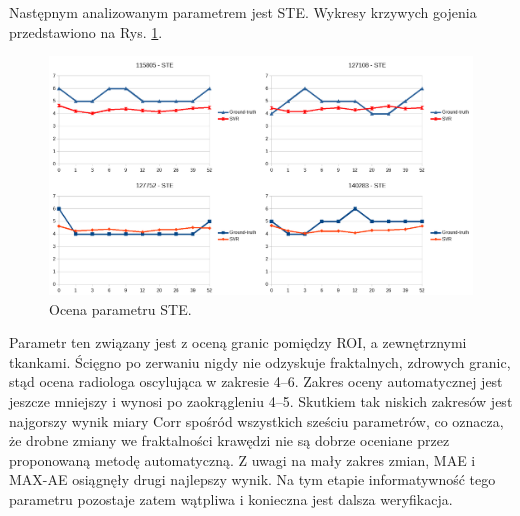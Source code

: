 Następnym analizowanym parametrem jest STE. Wykresy krzywych gojenia przedstawiono na Rys. \ref{fig:STE}.
\begin{figure}[h!]
	\centering
	\includegraphics[width=1\textwidth]{figures/STE.png}
	\caption{Ocena parametru STE.}\label{fig:STE}
\end{figure}
Parametr ten związany jest z oceną granic pomiędzy ROI, a zewnętrznymi tkankami. Ścięgno po zerwaniu nigdy nie odzyskuje fraktalnych, zdrowych granic, stąd ocena radiologa oscylująca w zakresie 4--6. Zakres oceny automatycznej jest jeszcze mniejszy i wynosi po zaokrągleniu 4--5. Skutkiem tak niskich zakresów jest najgorszy wynik miary Corr spośród wszystkich sześciu parametrów, co oznacza, że drobne zmiany we fraktalności krawędzi nie są dobrze oceniane przez proponowaną metodę automatyczną. Z uwagi na mały zakres zmian, MAE i MAX-AE osiągnęły drugi najlepszy wynik. Na tym etapie informatywność tego parametru pozostaje zatem wątpliwa i konieczna jest dalsza weryfikacja.

